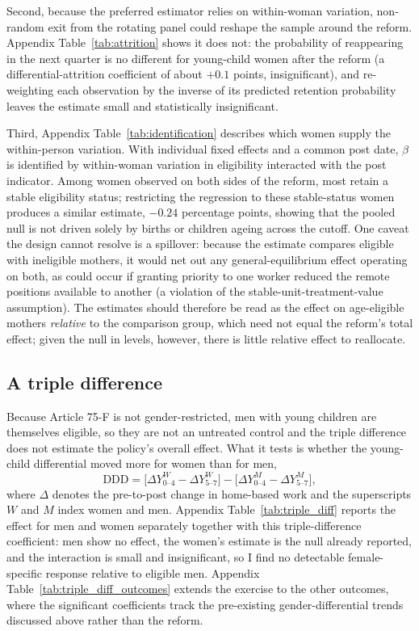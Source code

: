 \documentclass[12pt]{article}
\begin{document}
Second, because the preferred estimator relies on within-woman variation, non-random exit from the rotating panel could reshape the sample around the reform. Appendix Table~\ref{tab:attrition} shows it does not: the probability of reappearing in the next quarter is no different for young-child women after the reform (a differential-attrition coefficient of about $+0.1$ points, insignificant), and re-weighting each observation by the inverse of its predicted retention probability leaves the estimate small and statistically insignificant.

Third, Appendix Table~\ref{tab:identification} describes which women supply the within-person variation. With individual fixed effects and a common post date, $\beta$ is identified by within-woman variation in eligibility interacted with the post indicator. Among women observed on both sides of the reform, most retain a stable eligibility status; restricting the regression to these stable-status women produces a similar estimate, $-0.24$ percentage points, showing that the pooled null is not driven solely by births or children ageing across the cutoff. One caveat the design cannot resolve is a spillover: because the estimate compares eligible with ineligible mothers, it would net out any general-equilibrium effect operating on both, as could occur if granting priority to one worker reduced the remote positions available to another (a violation of the stable-unit-treatment-value assumption). The estimates should therefore be read as the effect on age-eligible mothers \emph{relative} to the comparison group, which need not equal the reform's total effect; given the null in levels, however, there is little relative effect to reallocate.

\subsection{A triple difference}\label{sec:triple}

Because Article 75-F is not gender-restricted, men with young children are themselves eligible, so they are not an untreated control and the triple difference does not estimate the policy's overall effect. What it tests is whether the young-child differential moved more for women than for men,
%
\begin{equation}
\text{DDD} = \big[\Delta Y^{W}_{0\text{--}4} - \Delta Y^{W}_{5\text{--}7}\big] - \big[\Delta Y^{M}_{0\text{--}4} - \Delta Y^{M}_{5\text{--}7}\big],
\label{eq:ddd}
\end{equation}
%
where $\Delta$ denotes the pre-to-post change in home-based work and the superscripts $W$ and $M$ index women and men. Appendix Table~\ref{tab:triple_diff} reports the effect for men and women separately together with this triple-difference coefficient: men show no effect, the women's estimate is the null already reported, and the interaction is small and insignificant, so I find no detectable female-specific response relative to eligible men. Appendix Table~\ref{tab:triple_diff_outcomes} extends the exercise to the other outcomes, where the significant coefficients track the pre-existing gender-differential trends discussed above rather than the reform.
\end{document}
